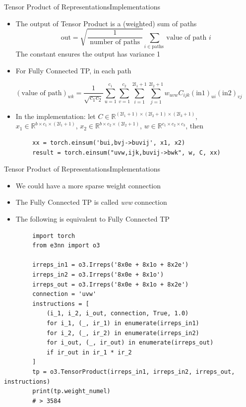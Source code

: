 \documentclass[pdf,serif]{beamer}
\newcommand{\empr}[1]{{\color{BerkeleyBlue}\emph{#1}}}
\begin{document}
\begin{frame}[fragile]{Tensor Product of Representations}{Implementations}
    \begin{itemize}
        \item The output of Tensor Product is a (weighted) sum of paths
        $$
        \text { out}=\sqrt{\frac{1}{\text { number of paths }}} \sum_{i \in \text {paths }} \text {value of path } i
        $$
        The constant ensures the output has variance 1
        \item For Fully Connected TP, in each path
    \end{itemize}
    $$
    (\text {value of path})_{w k}= \frac{1}{\sqrt{c_1 c_2}} \sum_{u=1}^{c_1} \sum_{v=1}^{c_2} \sum_{i=1}^{2 l_1+1} \sum_{j=1}^{2 l_2+1} w_{u v w} C_{i j k}(\mathrm{in} 1)_{u i}(\mathrm{in} 2)_{v j}
    $$
    \vspace*{-1em}
    \begin{itemize}
        \item In the implementation: let $C\in \mathbb{R}^{(2l_1+1)\times (2l_2+1) \times (2l_3+1)}$, $x_1\in \mathbb R^{b\times c_1\times (2l_1+1)}$, $x_2\in \mathbb R^{b\times c_2\times (2l_2+1)}$, $w\in \mathbb R^{c_1\times c_2\times c_3}$, then
    \end{itemize}
    \vspace*{1em}
    \begin{verbatim}
        xx = torch.einsum('bui,bvj->buvij', x1, x2)
        result = torch.einsum("uvw,ijk,buvij->bwk", w, C, xx)
    \end{verbatim}
\end{frame}

\begin{frame}[fragile]{Tensor Product of Representations}{Implementations}
    \begin{itemize}
        \item We could have a more sparse weight connection
        \item The Fully Connected TP is called \empr{uvw} connection
        \item The following is equivalent to Fully Connected TP
    \end{itemize}
    \vspace*{1em}
    \begin{verbatim}
        import torch
        from e3nn import o3

        irreps_in1 = o3.Irreps('8x0e + 8x1o + 8x2e') 
        irreps_in2 = o3.Irreps('8x0e + 8x1o')
        irreps_out = o3.Irreps('8x0e + 8x1o + 8x2e')
        connection = 'uvw'
        instructions = [
            (i_1, i_2, i_out, connection, True, 1.0)
            for i_1, (_, ir_1) in enumerate(irreps_in1)
            for i_2, (_, ir_2) in enumerate(irreps_in2)
            for i_out, (_, ir_out) in enumerate(irreps_out)
            if ir_out in ir_1 * ir_2
        ]
        tp = o3.TensorProduct(irreps_in1, irreps_in2, irreps_out, instructions)
        print(tp.weight_numel)
        # > 3584
    \end{verbatim}
\end{frame}
\end{document}
